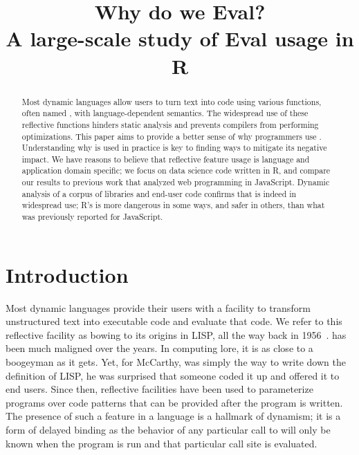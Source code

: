\documentclass[USenglish,cleveref, autoref, thm-restate]{lipics-v2019}
\title{Why do we Eval?\\[2mm]\Large A large-scale study of Eval usage in R}
\begin{document}
\maketitle

\begin{abstract}
  \noindent Most dynamic languages allow users to turn text into code
  using various functions, often named \eval, with language-dependent
  semantics. The widespread use of these reflective functions hinders
  static analysis and prevents compilers from performing
  optimizations. This paper aims to provide a better sense of why
  programmers use \eval. Understanding why \eval is used in practice
  is key to finding ways to mitigate its negative impact. We have
  reasons to believe that reflective feature usage is language and
  application domain specific; we focus on data science code written
  in R, and compare our results to previous work that analyzed web
  programming in JavaScript. Dynamic analysis of a corpus of
  \CranAllPackages libraries and \KaggleCode end-user code confirms that
  \eval is indeed in widespread use; R's \eval is more dangerous in
  some ways, and safer in others, than what was previously reported
  for JavaScript.
\end{abstract}


\section{Introduction}

Most dynamic languages provide their users with a facility to
transform unstructured text into executable code and evaluate that
code. We refer to this reflective facility as \eval bowing to its
origins in LISP, all the way back in 1956~\cite{lisp}. \Eval has been
much maligned over the years. In computing lore, it is as close to a
boogeyman as it gets. Yet, for McCarthy, \eval was simply the way to
write down the definition of LISP, he was surprised that someone coded
it up and offered it to end users. Since then, reflective facilities
have been used to parameterize programs over code patterns that can be
provided after the program is written. The presence of such a feature
in a language is a hallmark of dynamism; it is a form of delayed
binding as the behavior of any particular call to \eval will only be
known when the program is run and that particular call site is
evaluated.
\end{document}

